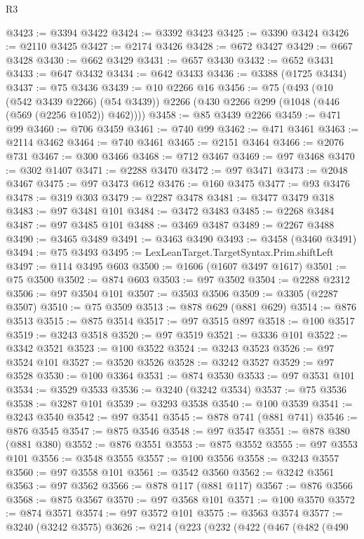 \begin{lexlean}{R3}
\begin{coremodule}
@3423 := @3394 @3422
@3424 := @3392 @3423
@3425 := @3390 @3424
@3426 := @2110 @3425
@3427 := @2174 @3426
@3428 := @672 @3427
@3429 := @667 @3428
@3430 := @662 @3429
@3431 := @657 @3430
@3432 := @652 @3431
@3433 := @647 @3432
@3434 := @642 @3433
@3436 := @3388 (@1725 @3434)
@3437 := @75 @3436
@3439 := @10 @2266 @16
@3456 := @75
    (@493
      (@10 (@542 @3439 @2266) (@54 @3439))
      @2266
      (@430 @2266 @299 (@1048 (@446 (@569 (@2256 @1052)) @462))))
@3458 := @85 @3439 @2266
@3459 := @471 @99
@3460 := @706 @3459
@3461 := @740 @99
@3462 := @471 @3461
@3463 := @2114 @3462
@3464 := @740 @3461
@3465 := @2151 @3464
@3466 := @2076 @731
@3467 := @300 @3466
@3468 := @712 @3467
@3469 := @97 @3468
@3470 := @302 @1407
@3471 := @2288 @3470
@3472 := @97 @3471
@3473 := @2048 @3467
@3475 := @97 @3473 @612
@3476 := @160 @3475
@3477 := @93 @3476
@3478 := @319 @303
@3479 := @2287 @3478
@3481 := @3477 @3479 @318
@3483 := @97 @3481 @101
@3484 := @3472 @3483
@3485 := @2268 @3484
@3487 := @97 @3485 @101
@3488 := @3469 @3487
@3489 := @2267 @3488
@3490 := @3465 @3489
@3491 := @3463 @3490
@3493 := @3458 (@3460 @3491)
@3494 := @75 @3493
@3495 := LexLeanTarget.TargetSyntax.Prim.shiftLeft
@3497 := @114 @3495 @603
@3500 := @1606 (@1607 @3497 @1617)
@3501 := @75 @3500
@3502 := @874 @603
@3503 := @97 @3502
@3504 := @2288 @2312
@3506 := @97 @3504 @101
@3507 := @3503 @3506
@3509 := @3305 (@2287 @3507)
@3510 := @75 @3509
@3513 := @878 @629 (@881 @629)
@3514 := @876 @3513
@3515 := @875 @3514
@3517 := @97 @3515 @897
@3518 := @100 @3517
@3519 := @3243 @3518
@3520 := @97 @3519
@3521 := @3336 @101
@3522 := @3342 @3521
@3523 := @100 @3522
@3524 := @3243 @3523
@3526 := @97 @3524 @101
@3527 := @3520 @3526
@3528 := @3242 @3527
@3529 := @97 @3528
@3530 := @100 @3364
@3531 := @874 @3530
@3533 := @97 @3531 @101
@3534 := @3529 @3533
@3536 := @3240 (@3242 @3534)
@3537 := @75 @3536
@3538 := @3287 @101
@3539 := @3293 @3538
@3540 := @100 @3539
@3541 := @3243 @3540
@3542 := @97 @3541
@3545 := @878 @741 (@881 @741)
@3546 := @876 @3545
@3547 := @875 @3546
@3548 := @97 @3547
@3551 := @878 @380 (@881 @380)
@3552 := @876 @3551
@3553 := @875 @3552
@3555 := @97 @3553 @101
@3556 := @3548 @3555
@3557 := @100 @3556
@3558 := @3243 @3557
@3560 := @97 @3558 @101
@3561 := @3542 @3560
@3562 := @3242 @3561
@3563 := @97 @3562
@3566 := @878 @117 (@881 @117)
@3567 := @876 @3566
@3568 := @875 @3567
@3570 := @97 @3568 @101
@3571 := @100 @3570
@3572 := @874 @3571
@3574 := @97 @3572 @101
@3575 := @3563 @3574
@3577 := @3240 (@3242 @3575)
@3626 := @214
    (@223
      (@232
        (@422
          (@467
            (@482
              (@490

\end{coremodule}
\end{lexlean}
